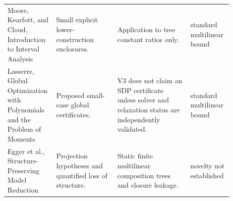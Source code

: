 \begin{tabular}{@{}>{\raggedright\arraybackslash}p{0.17\linewidth}>{\raggedright\arraybackslash}p{0.26\linewidth}>{\raggedright\arraybackslash}p{0.31\linewidth}>{\raggedright\arraybackslash}p{0.16\linewidth}@{}}
Moore, Kearfott, and Cloud, Introduction to Interval Analysis & Small explicit lower-construction enclosures. & Application to tree constant ratios only. & standard multilinear bound \\
Lasserre, Global Optimization with Polynomials and the Problem of Moments & Proposed small-case global certificates. & V3 does not claim an SDP certificate unless solver and relaxation status are independently validated. & standard multilinear bound \\
Egger et al., Structure-Preserving Model Reduction & Projection hypotheses and quantified loss of structure. & Static finite multilinear composition trees and closure leakage. & novelty not established \\
\bottomrule
\end{tabular}
